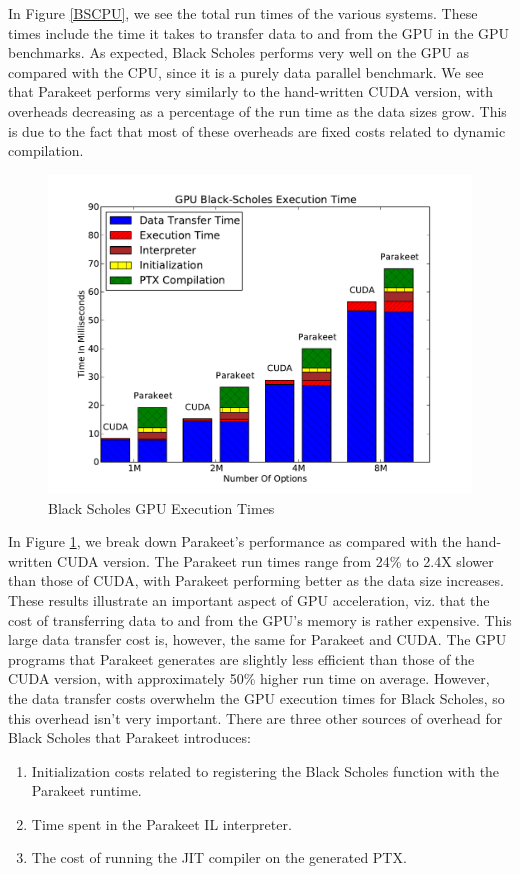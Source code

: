 \documentclass[preprint]{sigplanconf}
\begin{document}
In Figure \ref{BSCPU}, we see the total run times of the various systems. These times include the time it takes to transfer data to and from the GPU in the GPU benchmarks.  As expected, Black Scholes performs very well on the GPU as compared with the CPU, since it is a purely data parallel benchmark.  We see that Parakeet performs very similarly to the hand-written CUDA version, with overheads decreasing as a percentage of the run time as the data sizes grow.  This is due to the fact that most of these overheads are fixed costs related to dynamic compilation.

\begin{figure}
\includegraphics[scale=0.45]{BSNOCPU.pdf}
\caption{Black Scholes GPU Execution Times}
\label{BSGPU}
\end{figure}

In Figure \ref{BSGPU}, we break down Parakeet's performance as compared with the hand-written CUDA version.  The Parakeet run times range from 24\% to 2.4X slower than those of CUDA, with Parakeet performing better as the data size increases.  These results illustrate an important aspect of GPU acceleration, viz. that the cost of transferring data to and from the GPU's memory is rather expensive.  This large data transfer cost is, however, the same for Parakeet and CUDA.  The GPU programs that Parakeet generates are slightly less efficient than those of the CUDA version, with approximately 50\% higher run time on average.  However, the data transfer costs overwhelm the GPU execution times for Black Scholes, so this overhead isn't very important.  There are three other sources of overhead for Black Scholes that Parakeet introduces:
\begin{enumerate}
\item Initialization costs related to registering the Black Scholes function with the Parakeet runtime.
\item Time spent in the Parakeet IL interpreter.
\item The cost of running the JIT compiler on the generated PTX.
\end{enumerate}
\end{document}
